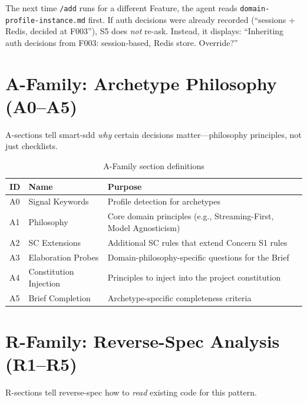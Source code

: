 \documentclass[11pt,a4paper,openright,twoside]{report}
\newcommand{\cmd}[1]{\texttt{/#1}}
\newcommand{\file}[1]{\texttt{#1}}
\begin{document}
The next time \cmd{add} runs for a different Feature, the agent reads \file{domain-profile-instance.md} first. If auth decisions were already recorded (``sessions + Redis, decided at F003''), S5 does \emph{not} re-ask. Instead, it displays: ``Inheriting auth decisions from F003: session-based, Redis store. Override?''

\section{A-Family: Archetype Philosophy (A0--A5)}

A-sections tell smart-sdd \emph{why} certain decisions matter---philosophy principles, not just checklists.

\begin{table}[H]
\centering
\caption{A-Family section definitions}
\label{tab:a-sections}
\begin{tabularx}{\textwidth}{llX}
\toprule
\textbf{ID} & \textbf{Name} & \textbf{Purpose} \\
\midrule
A0 & Signal Keywords & Profile detection for archetypes \\
A1 & Philosophy & Core domain principles (e.g., Streaming-First, Model Agnosticism) \\
A2 & SC Extensions & Additional SC rules that extend Concern S1 rules \\
A3 & Elaboration Probes & Domain-philosophy-specific questions for the Brief \\
A4 & Constitution Injection & Principles to inject into the project constitution \\
A5 & Brief Completion & Archetype-specific completeness criteria \\
\bottomrule
\end{tabularx}
\end{table}

\section{R-Family: Reverse-Spec Analysis (R1--R5)}

R-sections tell reverse-spec how to \emph{read} existing code for this pattern.
\end{document}
